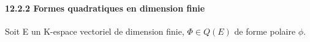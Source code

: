 	\paragraph{12.2.2 Formes quadratiques en dimension finie}
	Soit E un K-espace vectoriel de dimension finie, $\Phi \in Q(E)$ de forme
	polaire $\phi$.
